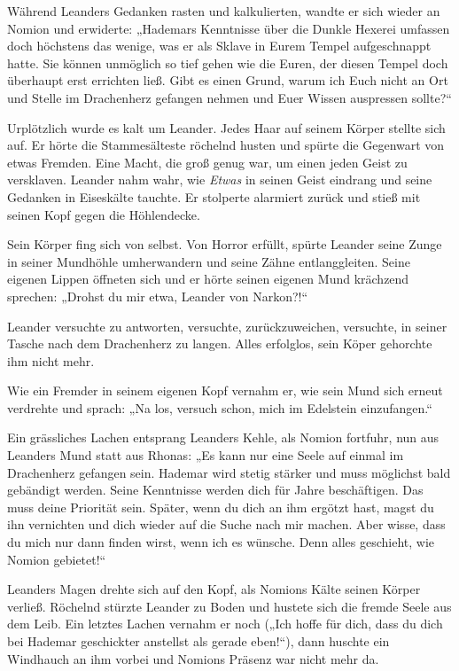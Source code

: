 Während Leanders Gedanken rasten und kalkulierten, wandte er sich wieder an Nomion und erwiderte: „Hademars Kenntnisse über die Dunkle Hexerei umfassen doch höchstens das wenige, was er als Sklave in Eurem Tempel aufgeschnappt hatte. Sie können unmöglich so tief gehen wie die Euren, der diesen Tempel doch überhaupt erst errichten ließ. Gibt es einen Grund, warum ich Euch nicht an Ort und Stelle im Drachenherz gefangen nehmen und Euer Wissen auspressen sollte?“

Urplötzlich wurde es kalt um Leander. Jedes Haar auf seinem Körper stellte sich auf. Er hörte die Stammesälteste röchelnd husten und spürte die Gegenwart von etwas Fremden. Eine Macht, die groß genug war, um einen jeden Geist zu versklaven. Leander nahm wahr, wie \textit{Etwas} in seinen Geist eindrang und seine Gedanken in Eiseskälte tauchte. Er stolperte alarmiert zurück und stieß mit seinen Kopf gegen die Höhlendecke.

Sein Körper fing sich von selbst. Von Horror erfüllt, spürte Leander seine Zunge in seiner Mundhöhle umherwandern und seine Zähne entlanggleiten. Seine eigenen Lippen öffneten sich und er hörte seinen eigenen Mund krächzend sprechen: „Drohst du mir etwa, Leander von Narkon?!“

Leander versuchte zu antworten, versuchte, zurückzuweichen, versuchte, in seiner Tasche nach dem Drachenherz zu langen. Alles erfolglos, sein Köper gehorchte ihm nicht mehr.

Wie ein Fremder in seinem eigenen Kopf vernahm er, wie sein Mund sich erneut verdrehte und sprach: „Na los, versuch schon, mich im Edelstein einzufangen.“

Ein grässliches Lachen entsprang Leanders Kehle, als Nomion fortfuhr, nun aus Leanders Mund statt aus Rhonas: „Es kann nur eine Seele auf einmal im Drachenherz gefangen sein. Hademar wird stetig stärker und muss möglichst bald gebändigt werden. Seine Kenntnisse werden dich für Jahre beschäftigen. Das muss deine Priorität sein. Später, wenn du dich an ihm ergötzt hast, magst du ihn vernichten und dich wieder auf die Suche nach mir machen. Aber wisse, dass du mich nur dann finden wirst, wenn ich es wünsche. Denn alles geschieht, wie Nomion gebietet!“

Leanders Magen drehte sich auf den Kopf, als Nomions Kälte seinen Körper verließ. Röchelnd stürzte Leander zu Boden und hustete sich die fremde Seele aus dem Leib. Ein letztes Lachen vernahm er noch („Ich hoffe für dich, dass du dich bei Hademar geschickter anstellst als gerade eben!“), dann huschte ein Windhauch an ihm vorbei und Nomions Präsenz war nicht mehr da.

